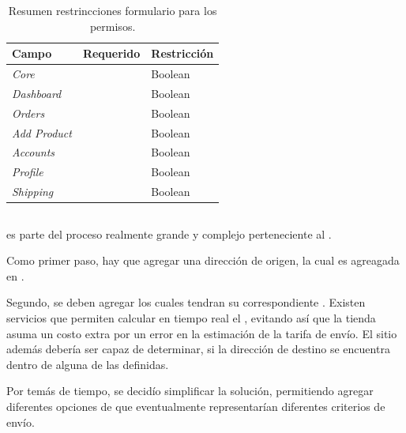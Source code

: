 \begin{table}[H]
    \centering
	\begin{tabular}{ |l|c||l| }
		\hline Campo & Requerido & Restricción \\ \hline
		\multirow{1}{*}{\textit{Core}} 			&  \checkmark 	& Boolean \\ \hline
		\multirow{1}{*}{\textit{Dashboard}} 	&  \checkmark	& Boolean \\ \hline
		\multirow{1}{*}{\textit{Orders}} 		&  \checkmark	& Boolean \\ \hline
		\multirow{1}{*}{\textit{Add Product}} 	&  \checkmark	& Boolean \\ \hline
		\multirow{1}{*}{\textit{Accounts}} 		&  \checkmark	& Boolean \\ \hline
		\multirow{1}{*}{\textit{Profile}} 		&  \checkmark	& Boolean \\ \hline
		\multirow{1}{*}{\textit{Shipping}} 		&  \checkmark	& Boolean \\ \hline
	\end{tabular}
 	\caption{Resumen restrincciones formulario para los permisos.}
    \label{tab:dashboard:account:form:restrictions:account}
\end{table}


\subsection{\shippingEF}\label{cap:solucionImplementada:section:}

\shippingEF es parte del proceso realmente grande y complejo perteneciente al \workflowCPT \orderFulfillmentCOM. 

Como primer paso, hay que agregar una dirección de origen, la cual es agreagada en .

Segundo, se deben agregar \shippingZonesCOM los cuales tendran su correspondiente \shippingRatesCOM. Existen servicios que permiten calcular en tiempo real el \shippingRatesCOM, evitando así que la tienda asuma un costo extra por un error en la estimación de la tarifa de envío. El sitio además debería ser capaz de determinar, si la dirección de destino se encuentra dentro de alguna de las \shippingZonesCOM definidas.


Por temás de tiempo, se decidío simplificar la solución, permitiendo agregar diferentes opciones de \shippingEF que eventualmente representarían diferentes criterios de envío.

